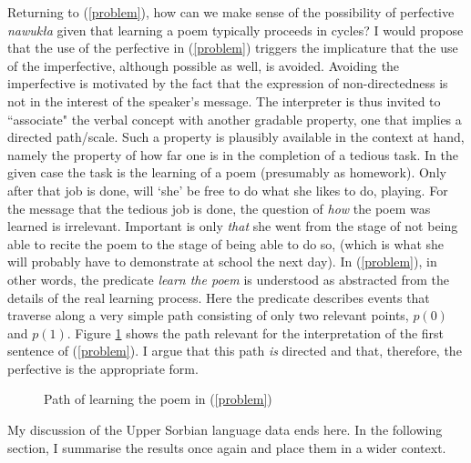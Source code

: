 \documentclass[output=paper,colorlinks,citecolor=brown]{langscibook}
\begin{document}
\noindent Returning to (\ref{problem}), how can we make sense 
of the possibility of perfective \textit{nawuk\l{a}} given that learning a poem typically proceeds in cycles? 
I would propose that the use of the perfective 
in (\ref{problem}) triggers the implicature that the use of the imperfective, although possible as well, is avoided. Avoiding the imperfective is motivated by the fact that the expression of non-directedness is not in the interest of the speaker's message. The interpreter is thus invited to ``associate" the verbal concept with another gradable property, one that implies a directed path/scale. Such a property is plausibly available in the context at hand, namely the property of how far one is in the completion of a tedious task. In the given case the task is the learning of a poem (presumably as homework). Only after that job is done, will `she' be free to do what she likes to do, playing. For the message that the tedious job is done, the question of \textit{how} the poem was learned is irrelevant. Important is only \textit{that} she went from the stage of not being able to recite the poem to the stage of being able to do so, (which is what she will probably have to demonstrate at school the next day). In (\ref{problem}), in other words, the predicate \textit{learn the poem} is understood as abstracted from the details of the real learning process. Here the predicate describes events that traverse along a very simple path consisting of only two relevant points, $p(0)$ and $p(1)$. Figure \ref{change} shows the path relevant for the interpretation of the first sentence of (\ref{problem}). I argue that this path \textit{is} directed and that, therefore, the perfective is the appropriate form. 


\begin{figure}
\caption{Path of learning the poem in (\ref{problem})}
\label{change}
\end{figure}

My discussion of the Upper Sorbian language data ends here. In the following section, I summarise the results once again and place them in a wider context.
\end{document}
